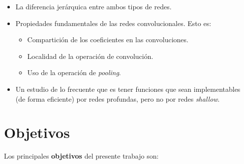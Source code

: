 \begin{itemize}
	\item La diferencia jerárquica entre ambos tipos de redes.
	\item Propiedades fundamentales de las redes convolucionales. Esto es:
	      \begin{itemize}
		      \item Compartición de los coeficientes en las convoluciones.
		      \item Localidad de la operación de convolución.
		      \item Uso de la operación de \textit{pooling}.
	      \end{itemize}
	\item Un estudio de lo frecuente que es tener funciones que sean implementables (de forma eficiente) por redes profundas, pero no por redes \textit{shallow}.
\end{itemize}

\section{Objetivos}

Los principales \textbf{objetivos} del presente trabajo son:

